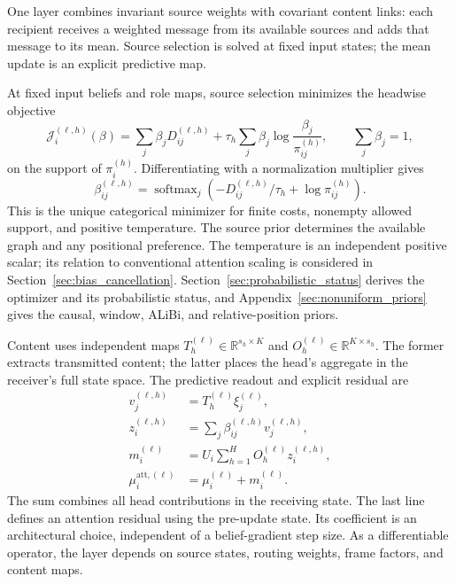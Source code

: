 \documentclass[twoside,11pt]{article}
\newcommand{\softmax}{\operatorname{softmax}}
\begin{document}
One layer combines invariant source weights with covariant content links: each recipient receives a weighted message from its available sources and adds that message to its mean. Source selection is solved at fixed input states; the mean update is an explicit predictive map.

At fixed input beliefs and role maps, source selection minimizes the headwise objective
\begin{equation}
\mathcal J_i^{(\ell,h)}(\beta)
=\sum_j\beta_jD_{ij}^{(\ell,h)}
+\tau_h\sum_j\beta_j\log\frac{\beta_j}{\pi_{ij}^{(h)}},
\qquad \sum_j\beta_j=1,
\label{eq:relational_routing_objective}
\end{equation}
on the support of $\pi_i^{(h)}$. Differentiating with a normalization multiplier gives
\begin{equation}
\beta_{ij}^{(\ell,h)}
=\softmax_j\left(-D_{ij}^{(\ell,h)}/\tau_h+\log\pi_{ij}^{(h)}\right).
\label{eq:relational_routing}
\end{equation}
This is the unique categorical minimizer for finite costs, nonempty allowed support, and positive temperature. The source prior determines the available graph and any positional preference. The temperature is an independent positive scalar; its relation to conventional attention scaling is considered in Section~\ref{sec:bias_cancellation}. Section~\ref{sec:probabilistic_status} derives the optimizer and its probabilistic status, and Appendix~\ref{sec:nonuniform_priors} gives the causal, window, ALiBi, and relative-position priors.

Content uses independent maps $T_h^{(\ell)}\in\mathbb R^{s_h\times K}$ and $O_h^{(\ell)}\in\mathbb R^{K\times s_h}$. The former extracts transmitted content; the latter places the head's aggregate in the receiver's full state space. The predictive readout and explicit residual are
\begin{align}
v_j^{(\ell,h)}&=T_h^{(\ell)}\xi_j^{(\ell)},\\
z_i^{(\ell,h)}&=\sum_j\beta_{ij}^{(\ell,h)}v_j^{(\ell,h)},\\
m_i^{(\ell)}&=U_i\sum_{h=1}^{H}O_h^{(\ell)}z_i^{(\ell,h)},\\
\mu_i^{\mathrm{att},(\ell)}&=\mu_i^{(\ell)}+m_i^{(\ell)}.
\label{eq:relational_predictive_residual}
\end{align}
The sum combines all head contributions in the receiving state. The last line defines an attention residual using the pre-update state. Its coefficient is an architectural choice, independent of a belief-gradient step size. As a differentiable operator, the layer depends on source states, routing weights, frame factors, and content maps.
\end{document}
